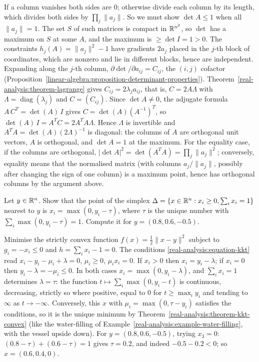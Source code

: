 \begin{solution}
If a column vanishes both sides are $0$; otherwise divide each column by its length, which divides both sides by $\prod_j\|a_j\|$. So we must show $\det A \leq 1$ when all $\|a_j\| = 1$. The set $S$ of
such matrices is compact in $\mathbb{R}^{n^2}$, so $\det$ has a maximum on $S$ at some $A$, and the maximum is $\geq \det I = 1 > 0$. The constraints $h_j(A) = \|a_j\|^2 - 1$ have gradients $2a_j$ placed in the
$j$-th block of coordinates, which are nonzero and lie in different blocks, hence are independent. Expanding along the $j$-th column, $\partial\det/\partial a_{ij} = C_{ij}$, the $(i, j)$ cofactor
(Proposition~\ref{linear-algebra:proposition-determinant-properties}). Theorem~\ref{real-analysis:theorem-lagrange} gives $C_{ij} = 2\lambda_ja_{ij}$, that is, $C = 2A\Lambda$ with
$\Lambda = \operatorname{diag}(\lambda_j)$ and $C = (C_{ij})$. Since $\det A \neq 0$, the adjugate formula $A\,C^T = \det(A)\,I$ gives $C = \det(A)(A^{-1})^T$, so $\det(A)\,I = A^TC = 2A^TA\Lambda$. Hence $\Lambda$ is invertible and
$A^TA = \det(A)(2\Lambda)^{-1}$ is diagonal: the columns of $A$ are orthogonal unit vectors, $A$ is orthogonal, and $\det A = 1$ at the maximum. For the equality case, if the columns are orthogonal,
$|\det A|^2 = \det(A^TA) = \prod_j\|a_j\|^2$; conversely, equality means that the normalised matrix (with columns $a_j/\|a_j\|$, possibly after changing the sign of one column) is a maximum point, hence
has orthogonal columns by the argument above.
\end{solution}

\begin{exercise}\label{real-analysis:exercise-projection-simplex}
Let $y \in \mathbb{R}^n$. Show that the point of the simplex $\Delta = \{x \in \mathbb{R}^n : x_i \geq 0, \sum_ix_i = 1\}$ nearest to $y$ is $x_i = \max(0, y_i - \tau)$, where $\tau$ is the unique number with
$\sum_i\max(0, y_i - \tau) = 1$. Compute it for $y = (0.8, 0.6, -0.5)$.
\end{exercise}

\begin{solution}
Minimise the strictly convex function $f(x) = \frac12\|x - y\|^2$ subject to $g_i = -x_i \leq 0$ and $h = \sum_ix_i - 1 = 0$. The conditions \eqref{real-analysis:equation-kkt} read
$x_i - y_i - \mu_i + \lambda = 0$, $\mu_i \geq 0$, $\mu_ix_i = 0$. If $x_i > 0$ then $x_i = y_i - \lambda$; if $x_i = 0$ then $y_i - \lambda = -\mu_i \leq 0$. In both cases $x_i = \max(0, y_i - \lambda)$, and
$\sum_ix_i = 1$ determines $\lambda = \tau$: the function $t \mapsto \sum_i\max(0, y_i - t)$ is continuous, decreasing, strictly so where positive, equal to $0$ for $t \geq \max_iy_i$ and tending to $\infty$ as
$t \to -\infty$. Conversely, this $x$ with $\mu_i = \max(0, \tau - y_i)$ satisfies the conditions, so it is the unique minimum by Theorem~\ref{real-analysis:theorem-kkt-convex} (like the water-filling of
Example~\ref{real-analysis:example-water-filling}, with the vessel upside down). For $y = (0.8, 0.6, -0.5)$, trying $x_3 = 0$: $(0.8 - \tau) + (0.6 - \tau) = 1$ gives $\tau = 0.2$, and indeed
$-0.5 - 0.2 < 0$; so $x = (0.6, 0.4, 0)$.
\end{solution}

